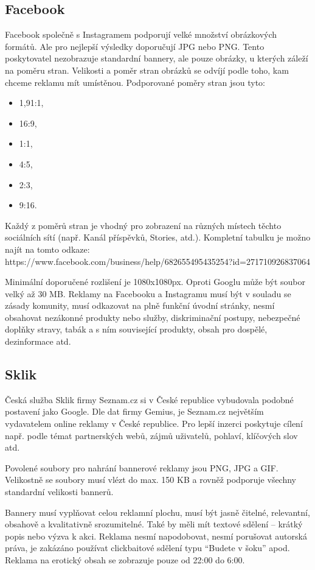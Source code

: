     \subsection{Facebook}
    Facebook společně s Instagramem podporují velké množství obrázkových formátů. Ale pro nejlepší výsledky doporučují JPG nebo PNG.
    Tento poskytovatel nezobrazuje standardní bannery, ale pouze obrázky, u kterých záleží na poměru stran.
    Velikosti a poměr stran obrázků se odvíjí podle toho, kam chceme reklamu mít umístěnou. Podporované poměry stran jsou tyto:
    \begin{itemize}
        \item 1,91:1,
        \item 16:9,
        \item 1:1,
        \item 4:5,
        \item 2:3,
        \item 9:16.
    \end{itemize}

    Každý z poměrů stran je vhodný pro zobrazení na různých místech těchto sociálních sítí (např. Kanál příspěvků, Stories, atd.).
    Kompletní tabulku je možno najít na tomto odkaze: https://www.facebook.com/business/help/682655495435254?id=271710926837064

    Minimální doporučené rozlišení je 1080x1080px. Oproti Googlu může být soubor velký až 30 MB.
    Reklamy na Facebooku a Instagramu musí být v souladu se zásady komunity, musí odkazovat na plně funkční úvodní stránky,
    nesmí obsahovat nezákonné produkty nebo služby, diskriminační postupy, nebezpečné doplňky stravy, tabák a s ním související produkty,
    obsah pro dospělé, dezinformace atd.

    \subsection{Sklik}
    Česká služba Sklik firmy Seznam.cz si v České republice vybudovala podobné postavení jako Google.
    Dle dat firmy Gemius, je Seznam.cz největším vydavatelem online reklamy v České republice. Pro lepší inzerci poskytuje cílení
    např. podle témat partnerských webů, zájmů uživatelů, pohlaví, klíčových slov atd.

    Povolené soubory pro nahrání bannerové reklamy jsou PNG, JPG a GIF. Velikostně se soubory musí vlézt do max. 150 KB a
    rovněž podporuje všechny standardní velikosti bannerů.

    Bannery musí vyplňovat celou reklamní plochu, musí být jasně čitelné, relevantní, obsahově a kvalitativně srozumitelné.
    Také by měli mít textové sdělení -- krátký popis nebo výzva k akci. Reklama nesmí napodobovat, nesmí porušovat autorská práva,
    je zakázáno používat clickbaitové sdělení typu \enquote{Budete v šoku} apod. Reklama na erotický obsah se zobrazuje pouze od 22:00 do 6:00.  

\endinput